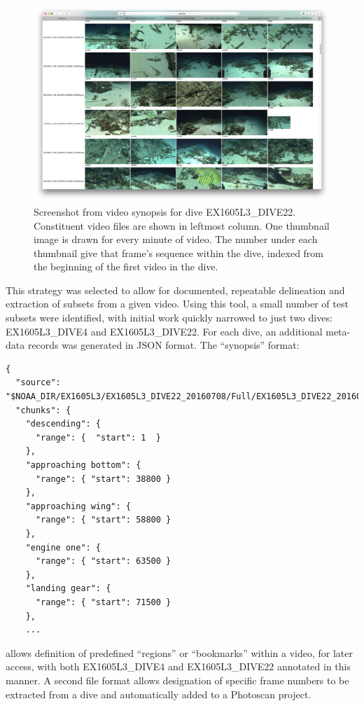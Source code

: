 \documentclass[letterpaper,12pt]{article}
\begin{document}
\begin{figure}[p]
    \centering
    \includegraphics[width=\textwidth]{images/thumbnailer_screenshot.png}
    \caption{Screenshot from video synopsis for dive EX1605L3\_DIVE22.   Constituent video files are shown in leftmost column.   One thumbnail image is drawn for every minute of video.  The number under each thumbnail give that frame's sequence within the dive, indexed from the beginning of the first video in the dive.}
    \label{img:thumbnails}
\end{figure}

This strategy was selected to allow for documented, repeatable delineation and extraction of subsets from a given video.  Using this tool, a small number of test subsets were identified, with initial work quickly narrowed to just two dives: EX1605L3\_DIVE4 and EX1605L3\_DIVE22.  For each dive, an additional meta-data records was generated in JSON format.  The ``synopsis'' format:

\begin{Verbatim}[fontsize=\small]
{
  "source": "$NOAA_DIR/EX1605L3/EX1605L3_DIVE22_20160708/Full/EX1605L3_DIVE22_20160708.json",
  "chunks": {
    "descending": {
      "range": {  "start": 1  }
    },
    "approaching bottom": {
      "range": { "start": 38800 }
    },
    "approaching wing": {
      "range": { "start": 58800 }
    },
    "engine one": {
      "range": { "start": 63500 }
    },
    "landing gear": {
      "range": { "start": 71500 }
    },
    ...
\end{Verbatim}


\noindent allows definition of predefined ``regions'' or ``bookmarks'' within a video, for later access, with both EX1605L3\_DIVE4 and EX1605L3\_DIVE22 annotated in this manner.  A second file format allows designation of specific frame numbers to be extracted from a dive and automatically added to a Photoscan project.
\end{document}
